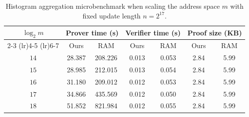 \begin{table}[t]
    \centering
    \small
    \caption{Histogram aggregation microbenchmark when scaling the address
    space $m$ with fixed update length $n=2^{17}$.}
    \label{tab:histogram-m-scale}
    \begin{tabular}{ccccccc}
        \toprule
        \multirow{2}{*}{$\log_2 m$}
        & \multicolumn{2}{c}{Prover time (s)}
        & \multicolumn{2}{c}{Verifier time (s)}
        & \multicolumn{2}{c}{Proof size (KB)} \\
        \cmidrule(lr){2-3} \cmidrule(lr){4-5} \cmidrule(lr){6-7}
        & Ours & RAM & Ours & RAM & Ours & RAM \\
        \midrule
        $14$ & 28.387 & 208.226 & 0.013 & 0.053 & 2.84 & 5.99 \\
        $15$ & 28.985 & 212.015 & 0.013 & 0.054 & 2.84 & 5.99 \\
        $16$ & 31.180 & 209.012 & 0.012 & 0.053 & 2.84 & 5.99 \\
        $17$ & 34.866 & 435.569 & 0.012 & 0.050 & 2.84 & 5.99 \\
        $18$ & 51.852 & 821.984 & 0.012 & 0.055 & 2.84 & 5.99 \\
        \bottomrule
    \end{tabular}
\end{table}
